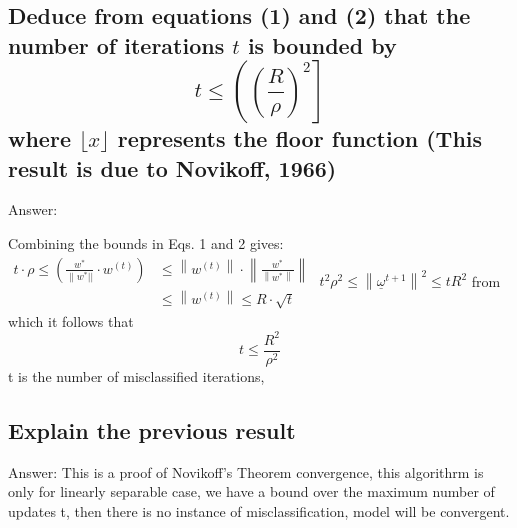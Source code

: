 \documentclass{article}
\begin{document}
\subsection{\textbf{Deduce from equations (1) and (2) that the number of iterations $t$ is bounded by
$$
t \leq\left(\left(\frac{R}{\rho}\right)^{2}\right]
$$
where $\lfloor x\rfloor$ represents the floor function (This result is due to Novikoff, 1966)}}
Answer:
\newline

Combining the bounds in Eqs. 1 and 2 gives:\newline
$\begin{aligned} t ·\rho \leqslant\left(\frac{w^{*}}{\| w^{*}||} \cdot w^{(t)}\right) & \leqslant\left\|w^{(t)}\right\| \cdot\left\|\frac{w^{*}}{\left\|w^{*}\right\|}\right\| \\ & \leq\left\|w^{(t)}\right\| \leqslant R \cdot \sqrt{t} \end{aligned}$
\newline
$t^{2} \rho^{2} \leq\left\|\underline{\omega}{ }^{t+1}\right\|^{2}
\leq t R^{2}$ 
\newline
from which it follows that
$$
t \leq \frac{R^{2}}{\rho^{2}}
$$
t is the number of misclassified iterations,
\subsection{\textbf{Explain the previous result}}
Answer:
This is a proof of Novikoff's Theorem convergence,  this algorithrm is only for linearly separable case, we have a bound over the maximum number of updates t, then there is no instance of misclassification, model will be convergent.
\end{document}
